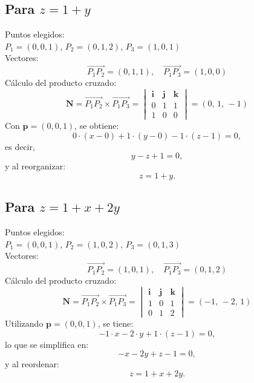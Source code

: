 \documentclass{article}
\begin{document}
\subsection{Para $z = 1 + y$}
Puntos elegidos: \\ 
$P_1 = (0,0,1)$, $P_2 = (0,1,2)$, $P_3 = (1,0,1)$ \\[1mm]
Vectores:
\begin{equation*}
    \overrightarrow{P_1P_2} = (0,1,1), \quad \overrightarrow{P_1P_3} = (1,0,0)
\end{equation*}
Cálculo del producto cruzado:
\begin{equation*}
    \mathbf{N} = \overrightarrow{P_1P_2} \times \overrightarrow{P_1P_3} =
    \begin{vmatrix} 
    \mathbf{i} & \mathbf{j} & \mathbf{k} \\
    0 & 1 & 1 \\
    1 & 0 & 0
    \end{vmatrix} = (0,\,1,\,-1)
\end{equation*}
Con \( \mathbf{p} = (0,0,1) \), se obtiene:
\[
0\cdot (x-0) + 1\cdot (y-0) -1\cdot (z-1)= 0,
\]
es decir,
\[
y - z + 1 = 0,
\]
y al reorganizar:
\[
z = 1 + y.
\]

\subsection{Para $z = 1 + x + 2y$}
Puntos elegidos: \\ 
$P_1 = (0,0,1)$, $P_2 = (1,0,2)$, $P_3 = (0,1,3)$ \\[1mm]
Vectores:
\begin{equation*}
    \overrightarrow{P_1P_2} = (1,0,1), \quad \overrightarrow{P_1P_3} = (0,1,2)
\end{equation*}
Cálculo del producto cruzado:
\begin{equation*}
    \mathbf{N} = \overrightarrow{P_1P_2} \times \overrightarrow{P_1P_3} =
    \begin{vmatrix} 
    \mathbf{i} & \mathbf{j} & \mathbf{k} \\
    1 & 0 & 1 \\
    0 & 1 & 2
    \end{vmatrix} = (-1,\,-2,\,1)
\end{equation*}
Utilizando \( \mathbf{p} = (0,0,1) \), se tiene:
\[
-1\cdot x -2\cdot y + 1\cdot (z-1) = 0,
\]
lo que se simplifica en:
\[
-x - 2y + z - 1 = 0,
\]
y al reordenar:
\[
z = 1 + x + 2y.
\]
\end{document}

